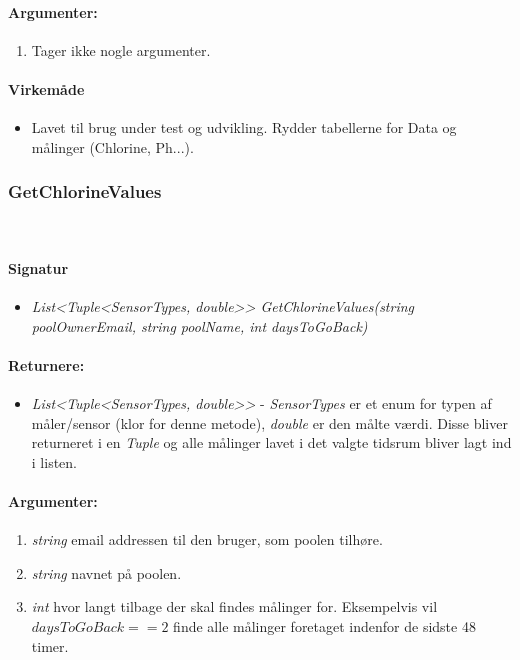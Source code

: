 \paragraph{Argumenter:}
\begin{enumerate}
	\item Tager ikke nogle argumenter.
\end{enumerate}

\paragraph{Virkemåde}
\begin{itemize}
	\item Lavet til brug under test og udvikling. Rydder tabellerne for Data og målinger (Chlorine, Ph...).
\end{itemize}







\subsubsection{GetChlorineValues}\ %






\paragraph{Signatur}
\begin{itemize}
	\item \textit{List<Tuple<SensorTypes, double>> GetChlorineValues(string poolOwnerEmail, string poolName, int daysToGoBack)}
\end{itemize}

\paragraph{Returnere:}
\begin{itemize}
	\item \textit{List<Tuple<SensorTypes, double>>} - \textit{SensorTypes} er et enum for typen af måler/sensor (klor for denne metode), \textit{double} er den målte værdi. Disse bliver returneret i en \textit{Tuple} og alle målinger lavet i det valgte tidsrum bliver lagt ind i listen.
\end{itemize}

\paragraph{Argumenter:}
\begin{enumerate}
	\item \textit{string} email addressen til den bruger, som poolen tilhøre.
	\item \textit{string} navnet på poolen.
	\item \textit{int} hvor langt tilbage der skal findes målinger for. Eksempelvis vil $daysToGoBack == 2$ finde alle målinger foretaget indenfor de sidste 48 timer.
\end{enumerate}

